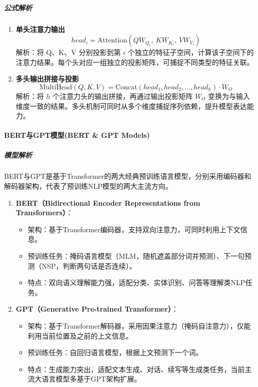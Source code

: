 \documentclass[12pt]{article}
\begin{document}
\subparagraph{公式解析}
\begin{enumerate}
    \item \textbf{单头注意力输出}
    \[
    head_i = \text{Attention}\left(Q W_{Q_i},\ K W_{K_i},\ V W_{V_i}\right)
    \]
    解析：将 Q、K、V 分别投影到第 $i$ 个独立的特征子空间，计算该子空间下的注意力结果。每个头对应一组独立的投影矩阵，可捕捉不同类型的特征关联。

    \item \textbf{多头输出拼接与投影}
    \[
    \text{MultiHead}(Q,K,V) = \text{Concat}(head_1, head_2, \dots, head_h) \cdot W_O
    \]
    解析：将 $h$ 个注意力头的输出拼接，再通过输出投影矩阵 $W_O$ 变换为与输入维度一致的结果。多头机制可同时从多个维度捕捉序列依赖，提升模型表达能力。
\end{enumerate}

\paragraph{BERT与GPT模型(BERT \& GPT Models)}
\subparagraph{模型解析}
BERT与GPT是基于Transformer的两大经典预训练语言模型，分别采用编码器和解码器架构，代表了预训练NLP模型的两大主流方向。
\begin{enumerate}
    \item \textbf{BERT（Bidirectional Encoder Representations from Transformers）}：
    \begin{itemize}
        \item 架构：基于Transformer编码器，支持双向注意力，可同时利用上下文信息。
        \item 预训练任务：掩码语言模型（MLM，随机遮盖部分词并预测）、下一句预测（NSP，判断两句话是否连续）。
        \item 特点：双向语义理解能力强，适配分类、实体识别、问答等理解类NLP任务。
    \end{itemize}
    \item \textbf{GPT（Generative Pre-trained Transformer）}：
    \begin{itemize}
        \item 架构：基于Transformer解码器，采用因果注意力（掩码自注意力），仅能利用当前位置及之前的上文信息。
        \item 预训练任务：自回归语言模型，根据上文预测下一个词。
        \item 特点：生成能力突出，适配文本生成、对话、续写等生成类任务，当前主流大语言模型多基于GPT架构扩展。
    \end{itemize}
\end{enumerate}
\end{document}
